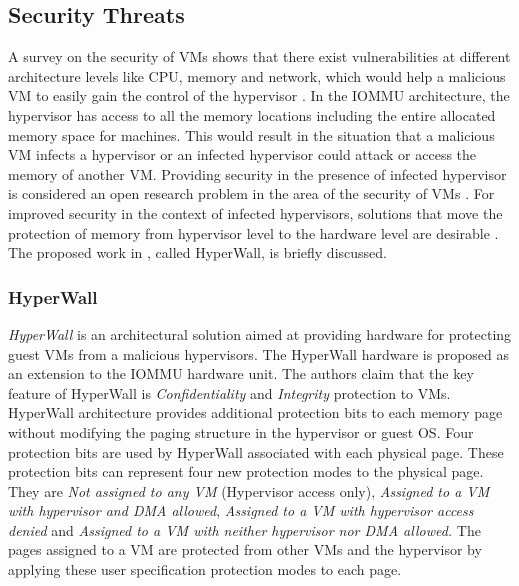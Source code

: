 \documentclass[a4paper,10pt,twocolumn]{article}
\begin{document}
  \subsection{Security Threats}

  A survey on the security of VMs shows that there exist vulnerabilities at different architecture levels like CPU, memory and network, which would help a malicious VM  to easily gain the control of the hypervisor \cite{jithin2014virtual}. In the IOMMU architecture, the hypervisor has access to all the memory locations including the entire  allocated memory space for machines. This would result in the situation that a malicious VM infects a hypervisor or an infected hypervisor could attack or access the memory of another VM. Providing security in the presence of infected hypervisor is  considered  an open research problem in the area of the  security of VMs \cite{szefer2012architectural}. For improved security in the context of infected hypervisors, solutions that  move the protection of memory from hypervisor level to the hardware level are desirable \cite{szefer2012architectural}. The proposed work in \cite{szefer2012architectural}, called HyperWall, is 
briefly discussed.

  \subsubsection{HyperWall}

  \textit{HyperWall} \cite{szefer2012architectural} is an architectural solution  aimed at  providing hardware for protecting guest VMs from a malicious hypervisors. The HyperWall hardware is proposed as an extension to the IOMMU hardware unit. The authors  claim that the key feature of HyperWall is \emph{Confidentiality} and \emph{Integrity } protection to VMs. HyperWall architecture provides additional protection bits to each memory page without modifying the paging structure in the hypervisor or guest OS. Four protection bits are used by HyperWall associated with each physical page. These protection bits can represent four new protection modes to the physical page. They are \emph{Not assigned to any VM} (Hypervisor access only), \emph{Assigned to a VM with hypervisor and DMA allowed}, \emph{Assigned to a VM with hypervisor access denied} and \emph{Assigned to a VM with neither hypervisor nor DMA allowed.} The pages assigned to a VM are protected from other VMs and the hypervisor by applying these user 
specification protection modes to each page. 
\end{document}
